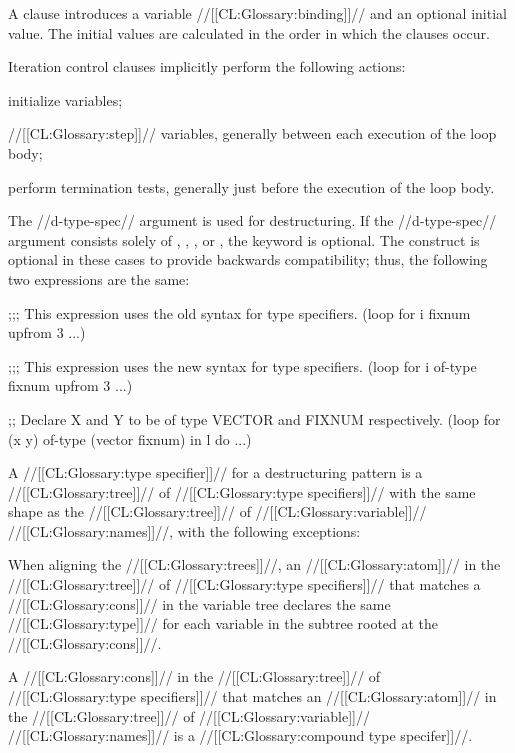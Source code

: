 \itemitem{\bull}  A  clause introduces a variable //[[CL:Glossary:binding]]//
  and an optional initial value.  The initial values are calculated 
  in the order in which the  clauses occur.
 
\itemitem{\bull}  
  Iteration control clauses implicitly perform the following actions:
 
\beginlist
\itemitem{--}  initialize variables;
 
\itemitem{--}  //[[CL:Glossary:step]]// variables, generally 
between each execution of the loop body;
 
\itemitem{--} perform termination tests, 
generally just before the execution of the
  loop body.
 
  \endlist
  \endlist
 
\endsubsubsection%


The //d-type-spec// argument is used for destructuring.
If the
//d-type-spec// argument consists solely of ,
, , or \nil, the  keyword is optional.
The  construct is optional in these cases to provide backwards
compatibility; thus, the following two expressions are the same:


\code
;;; This expression uses the old syntax for type specifiers.
 (loop for i fixnum upfrom 3 ...)
 
;;; This expression uses the new syntax for type specifiers.
 (loop for i of-type fixnum upfrom 3 ...)

;; Declare X and Y to be of type VECTOR and FIXNUM respectively.
 (loop for (x y) of-type (vector fixnum) 
       in l do ...)
\endcode
 
A //[[CL:Glossary:type specifier]]// for a destructuring pattern is a //[[CL:Glossary:tree]]// of 
//[[CL:Glossary:type specifiers]]// with the same shape as the //[[CL:Glossary:tree]]// of
//[[CL:Glossary:variable]]// //[[CL:Glossary:names]]//, with the following exceptions:
 
\beginlist 
\itemitem{\bull}
When aligning the //[[CL:Glossary:trees]]//, an //[[CL:Glossary:atom]]// in the
//[[CL:Glossary:tree]]// of //[[CL:Glossary:type specifiers]]// that matches a //[[CL:Glossary:cons]]// 
in the variable tree declares the same //[[CL:Glossary:type]]// for each variable
in the subtree rooted at the //[[CL:Glossary:cons]]//.
 
\itemitem{\bull} 
A //[[CL:Glossary:cons]]// in the //[[CL:Glossary:tree]]// of //[[CL:Glossary:type specifiers]]// that 
matches an //[[CL:Glossary:atom]]// in the //[[CL:Glossary:tree]]// of //[[CL:Glossary:variable]]// //[[CL:Glossary:names]]//
is a //[[CL:Glossary:compound type specifer]]//.
 
